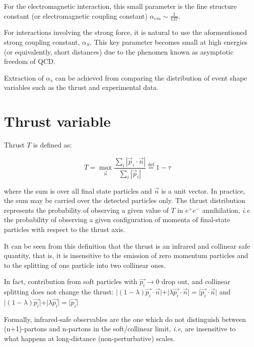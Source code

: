 \documentclass[../main.tex]{subfiles}
\begin{document}
For the electromagnetic interaction, this small parameter is the fine structure constant (or electromagnetic coupling constant) $\alpha_{em} \sim \frac{1}{137}$.

For interactions involving the strong force, it is natural to use the aformentioned strong coupling constant, $\alpha_S$. This key parameter becomes small 
at high energies (or equivalently, short distances) due to the phenomen known as asymptotic freedom of QCD.

Extraction of $\alpha_s$ can be achieved from comparing the distribution of event shape variables such as the thrust and experimental data. 


\section{Thrust variable}\label{sec:Thrust}

Thrust $T$ is defined as:

\begin{equation} \label{eq:Thrust}
    T = \max_{\vec{n}} \frac{\sum_i |\vec{p}_i \cdot \vec{n}|}{\sum_i |\vec{p}_i|} \stackrel{\text{def}}{=} 1-\tau
\end{equation}

where the sum is over all final state particles and $\vec{n}$ is a unit vector.
In practice, the sum may be carried over the detected particles only. 
The thrust distribution represents the probability of observing a given value of $T$ in $e^+e^-$ annihilation, \emph{i.e} the probability of observing a given configuration of momenta of final-state particles 
with respect to the thrust axis.

It can be seen from this definition that the thrust is an infrared and collinear safe quantity, that is, it is insensitive to the emission of zero momentum particles and to the splitting of 
one particle into two collinear ones.

In fact, contribution from soft particles with $\vec{p_i}\to 0$ drop out, and collinear splitting does not change the thrust:
$\vert (1-\lambda)\vec{p_i}\cdot \vec{n} \vert + \vert \lambda \vec{p_i}\cdot \vec{n}\vert = \vert \vec{p_i}\cdot \vec{n} \vert$ and 
$\vert (1-\lambda)\vec{p_i} \vert + \vert \lambda \vec{p_i}\vert = \vert \vec{p_i} \vert$

Formally, infrared-safe observables are the one which do not distinguish between (n+1)-partons and n-partons in the soft/collinear limit, \emph{i.e},
are insensitive to what happens at long-distance (non-perturbative) scales.
\end{document}
